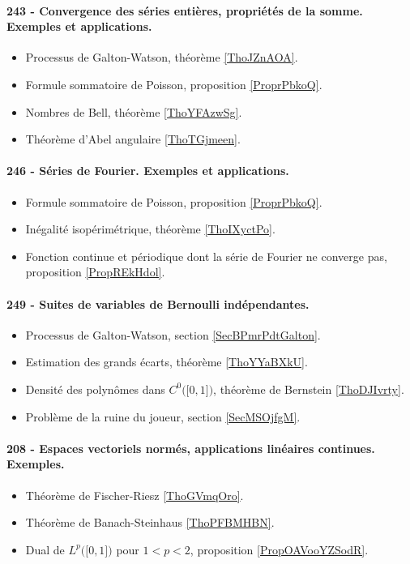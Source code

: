 \paragraph{243 - Convergence des séries entières, propriétés de la somme. Exemples et applications.}
\begin{itemize}
    \item Processus de Galton-Watson, théorème \ref{ThoJZnAOA}.
    \item Formule sommatoire de Poisson, proposition \ref{ProprPbkoQ}.
    \item Nombres de Bell, théorème \ref{ThoYFAzwSg}.
    \item Théorème d'Abel angulaire \ref{ThoTGjmeen}.
\end{itemize}
\paragraph{246 - Séries de Fourier. Exemples et applications.}
\begin{itemize}
    \item Formule sommatoire de Poisson, proposition \ref{ProprPbkoQ}.
    \item Inégalité isopérimétrique, théorème \ref{ThoIXyctPo}.
    \item Fonction continue et périodique dont la série de Fourier ne converge pas, proposition \ref{PropREkHdol}.
\end{itemize}
\paragraph{249 - Suites de variables de Bernoulli indépendantes.}
\begin{itemize}
    \item Processus de Galton-Watson, section \ref{SecBPmrPdtGalton}.
    \item Estimation des grands écarts, théorème \ref{ThoYYaBXkU}.
    \item Densité des polynômes dans \( C^0\big( \mathopen[ 0 , 1 \mathclose] \big)\), théorème de Bernstein \ref{ThoDJIvrty}.
    \item Problème de la ruine du joueur, section \ref{SecMSOjfgM}.
\end{itemize}
\paragraph{208 - Espaces vectoriels normés, applications linéaires continues. Exemples.}
\begin{itemize}
    \item Théorème de Fischer-Riesz \ref{ThoGVmqOro}.
    \item Théorème de Banach-Steinhaus \ref{ThoPFBMHBN}.
    \item Dual de \( L^p\big( \mathopen[ 0 , 1 \mathclose] \big)\) pour \( 1<p<2\), proposition \ref{PropOAVooYZSodR}.
\end{itemize}



